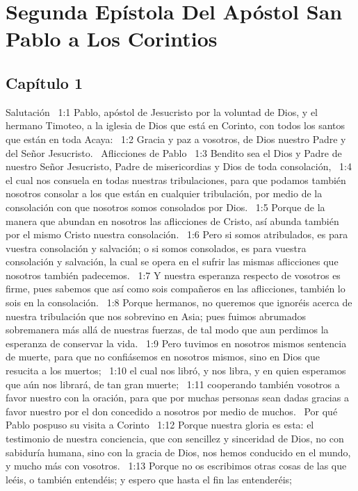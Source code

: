 \chapter{Segunda Epístola Del Apóstol San Pablo a Los Corintios}


\section*{Capítulo 1}
Salutación  
1:1 Pablo, apóstol de Jesucristo por la voluntad de Dios, y el hermano Timoteo, a la iglesia de Dios que está en Corinto, con todos los santos que están en toda Acaya:  
1:2 Gracia y paz a vosotros, de Dios nuestro Padre y del Señor Jesucristo.  
Aflicciones de Pablo  
1:3 Bendito sea el Dios y Padre de nuestro Señor Jesucristo, Padre de misericordias y Dios de toda consolación,  
1:4 el cual nos consuela en todas nuestras tribulaciones, para que podamos también nosotros consolar a los que están en cualquier tribulación, por medio de la consolación con que nosotros somos consolados por Dios.  
1:5 Porque de la manera que abundan en nosotros las aflicciones de Cristo, así abunda también por el mismo Cristo nuestra consolación.  
1:6 Pero si somos atribulados, es para vuestra consolación y salvación; o si somos consolados, es para vuestra consolación y salvación, la cual se opera en el sufrir las mismas aflicciones que nosotros también padecemos.  
1:7 Y nuestra esperanza respecto de vosotros es firme, pues sabemos que así como sois compañeros en las aflicciones, también lo sois en la consolación.  
1:8 Porque hermanos, no queremos que ignoréis acerca de nuestra tribulación que nos sobrevino en Asia; pues fuimos abrumados sobremanera más allá de nuestras fuerzas, de tal modo que aun perdimos la esperanza de conservar la vida.  
1:9 Pero tuvimos en nosotros mismos sentencia de muerte, para que no confiásemos en nosotros mismos, sino en Dios que resucita a los muertos;  
1:10 el cual nos libró, y nos libra, y en quien esperamos que aún nos librará, de tan gran muerte;  
1:11 cooperando también vosotros a favor nuestro con la oración, para que por muchas personas sean dadas gracias a favor nuestro por el don concedido a nosotros por medio de muchos.  
Por qué Pablo pospuso su visita a Corinto  
1:12 Porque nuestra gloria es esta: el testimonio de nuestra conciencia, que con sencillez y sinceridad de Dios, no con sabiduría humana, sino con la gracia de Dios, nos hemos conducido en el mundo, y mucho más con vosotros.  
1:13 Porque no os escribimos otras cosas de las que leéis, o también entendéis; y espero que hasta el fin las entenderéis;  
